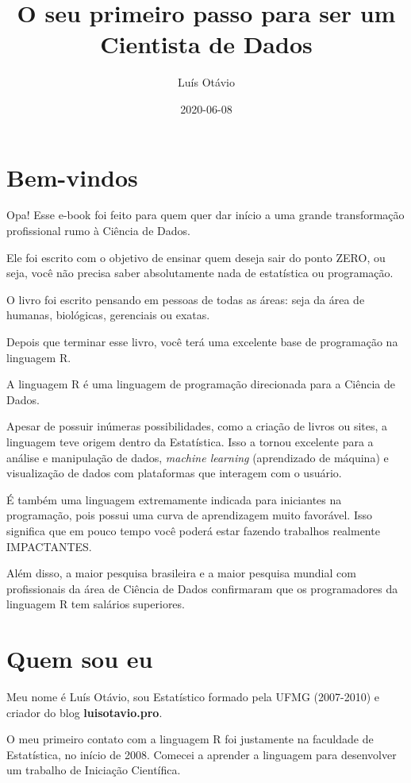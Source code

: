 \documentclass[
]{book}
\title{O seu primeiro passo para ser um Cientista de Dados}
\author{Luís Otávio}
\date{2020-06-08}
\begin{document}
\frontmatter
\maketitle

\mainmatter
\hypertarget{bem-vindos}{%
\chapter*{Bem-vindos}\label{bem-vindos}}

Opa! Esse e-book foi feito para quem quer dar início a uma grande
transformação profissional rumo à Ciência de Dados.

Ele foi escrito com o objetivo de ensinar quem deseja sair do ponto
ZERO, ou seja, você não precisa saber absolutamente nada de estatística
ou programação.

O livro foi escrito pensando em pessoas de todas as áreas: seja da área
de humanas, biológicas, gerenciais ou exatas.

Depois que terminar esse livro, você terá uma excelente base de
programação na linguagem R.

A linguagem R é uma linguagem de programação direcionada para a Ciência
de Dados.

Apesar de possuir inúmeras possibilidades, como a criação de livros ou
sites, a linguagem teve origem dentro da Estatística. Isso a tornou
excelente para a análise e manipulação de dados, \emph{machine learning}
(aprendizado de máquina) e visualização de dados com plataformas que
interagem com o usuário.

É também uma linguagem extremamente indicada para iniciantes na
programação, pois possui uma curva de aprendizagem muito favorável. Isso
significa que em pouco tempo você poderá estar fazendo trabalhos
realmente IMPACTANTES.

Além disso, a maior pesquisa brasileira e a maior pesquisa mundial com
profissionais da área de Ciência de Dados confirmaram que os
programadores da linguagem R tem salários superiores.

\hypertarget{quem-sou-eu}{%
\chapter{Quem sou eu}\label{quem-sou-eu}}

Meu nome é Luís Otávio, sou Estatístico formado pela UFMG (2007-2010) e
criador do blog \textbf{luisotavio.pro}.

O meu primeiro contato com a linguagem R foi justamente na faculdade de
Estatística, no início de 2008. Comecei a aprender a linguagem para
desenvolver um trabalho de Iniciação Científica.
\end{document}
